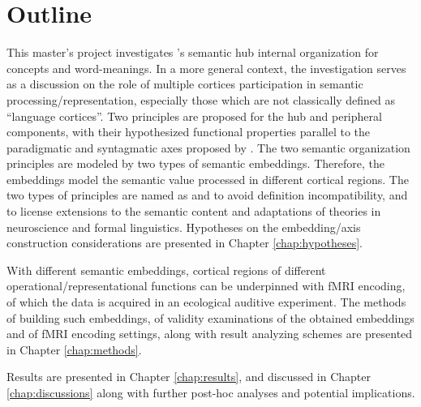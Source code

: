 \section{Outline}

This master's project investigates \citeauthor{pattersonWhereYouKnow2007}'s semantic hub internal organization for concepts and word-meanings. In a more general context, the investigation serves as a discussion on the role of multiple cortices participation in semantic processing\slash representation, especially those which are not classically defined as ``language cortices''. Two principles are proposed for the hub and peripheral components, with their hypothesized functional properties parallel to the paradigmatic and syntagmatic axes proposed by \citeauthor{jakobsonFundamentalsLanguage1963}. The two semantic organization principles are modeled by two types of semantic embeddings. Therefore, the embeddings model the semantic value processed in different cortical regions. The two types of principles are named as \similarity and \association to avoid definition incompatibility, and to license extensions to the semantic content and adaptations of theories in neuroscience and formal linguistics. Hypotheses on the embedding\slash axis construction considerations are presented in Chapter \ref{chap:hypotheses}.

With different semantic embeddings, cortical regions of different operational\slash  representational functions can be underpinned with fMRI encoding, of which the data is acquired in an ecological auditive experiment. The methods of building such embeddings, of validity examinations of the obtained embeddings and of fMRI encoding settings, along with result analyzing schemes are presented in Chapter \ref{chap:methods}.

Results are presented in Chapter \ref{chap:results}, and discussed in Chapter \ref{chap:discussions} along with further post-hoc analyses and potential implications.




